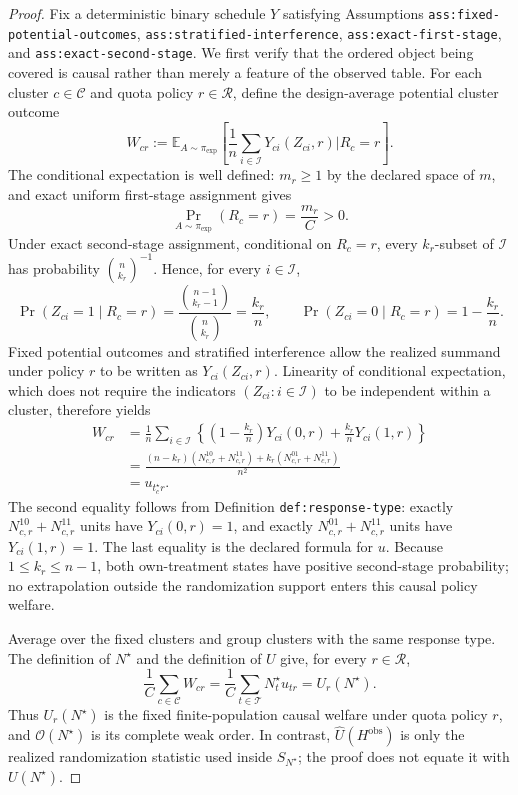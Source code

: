 \documentclass{article}
\begin{document}
\begin{proof}
Fix a deterministic binary schedule \(Y\) satisfying Assumptions \texttt{ass:fixed-potential-outcomes}, \texttt{ass:stratified-interference}, \texttt{ass:exact-first-stage}, and \texttt{ass:exact-second-stage}.  We first verify that the ordered object being covered is causal rather than merely a feature of the observed table.  For each cluster \(c\in\mathcal C\) and quota policy \(r\in\mathcal R\), define the design-average potential cluster outcome
\[
 W_{cr}:=
 \mathbb E_{A\sim\pi_{\exp}}\!\left[
   \frac{1}{n}\sum_{i\in\mathcal I}Y_{ci}(Z_{ci},r)
   \mathrel{\Big|} R_c=r
 \right].
\]
The conditional expectation is well defined: \(m_r\geq 1\) by the declared space of \(m\), and exact uniform first-stage assignment gives
\[
 \Pr_{A\sim\pi_{\exp}}(R_c=r)=\frac{m_r}{C}>0.
\]
Under exact second-stage assignment, conditional on \(R_c=r\), every \(k_r\)-subset of \(\mathcal I\) has probability \(\binom n{k_r}^{-1}\).  Hence, for every \(i\in\mathcal I\),
\[
 \Pr(Z_{ci}=1\mid R_c=r)
 =\frac{\binom{n-1}{k_r-1}}{\binom n{k_r}}
 =\frac{k_r}{n},
 \qquad
 \Pr(Z_{ci}=0\mid R_c=r)=1-\frac{k_r}{n}.
\]
Fixed potential outcomes and stratified interference allow the realized summand under policy \(r\) to be written as \(Y_{ci}(Z_{ci},r)\).  Linearity of conditional expectation, which does not require the indicators \((Z_{ci}:i\in\mathcal I)\) to be independent within a cluster, therefore yields
\[
\begin{aligned}
 W_{cr}
 &=\frac{1}{n}\sum_{i\in\mathcal I}
   \left\{
    \left(1-\frac{k_r}{n}\right)Y_{ci}(0,r)
    +\frac{k_r}{n}Y_{ci}(1,r)
   \right\}\\
 &=\frac{(n-k_r)(N_{c,r}^{10}+N_{c,r}^{11})
          +k_r(N_{c,r}^{01}+N_{c,r}^{11})}{n^2}\\
 &=u_{t_c^\star r}.
\end{aligned}
\]
The second equality follows from Definition \texttt{def:response-type}: exactly \(N_{c,r}^{10}+N_{c,r}^{11}\) units have \(Y_{ci}(0,r)=1\), and exactly \(N_{c,r}^{01}+N_{c,r}^{11}\) units have \(Y_{ci}(1,r)=1\).  The last equality is the declared formula for \(u\).  Because \(1\leq k_r\leq n-1\), both own-treatment states have positive second-stage probability; no extrapolation outside the randomization support enters this causal policy welfare.

Average over the fixed clusters and group clusters with the same response type.  The definition of \(N^\star\) and the definition of \(U\) give, for every \(r\in\mathcal R\),
\[
 \frac{1}{C}\sum_{c\in\mathcal C}W_{cr}
 =\frac{1}{C}\sum_{t\in\mathcal T}N_t^\star u_{tr}
 =U_r(N^\star).
\]
Thus \(U_r(N^\star)\) is the fixed finite-population causal welfare under quota policy \(r\), and \(\mathcal O(N^\star)\) is its complete weak order.  In contrast, \(\widehat U(H^{\mathrm{obs}})\) is only the realized randomization statistic used inside \(S_{N^\star}\); the proof does not equate it with \(U(N^\star)\).


\end{proof}
\end{document}

